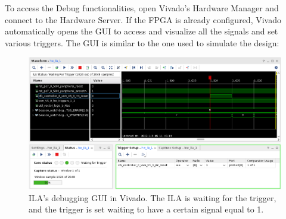 To access the Debug functionalities, open Vivado's Hardware Manager and connect to the Hardware Server. If the FPGA is already configured, Vivado automatically opens the GUI to access and visualize all the signals and set various triggers. The GUI is similar to the one used to simulate the design:

\begin{figure}[H]
\centering
\includegraphics[width=0.80\linewidth]{images/chapter3/ila_example2.png}
\caption{ILA's debugging GUI in Vivado. The ILA is waiting for the trigger, and the trigger is set waiting to have a certain signal equal to 1.}
\end{figure}

